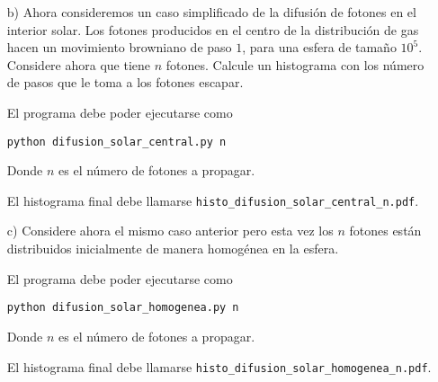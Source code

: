 \documentclass{article}
\begin{document}
\begin{enumerate}
\begin{itemize}
\item[b)] Ahora consideremos un caso simplificado de la difusi\'on de
  fotones en el interior solar. Los fotones producidos
  en el centro de la distribuci\'on de gas hacen un movimiento
  browniano de paso $1$, para una esfera de tama\~no $10^5$. Considere
  ahora que tiene $n$ fotones. Calcule un histograma con los n\'umero
  de pasos que le toma a los fotones escapar.

  El programa debe poder ejecutarse como
\begin{verbatim}
python difusion_solar_central.py n
\end{verbatim}
Donde $n$ es el n\'umero de fotones a propagar. 


El histograma final
debe llamarse \verb"histo_difusion_solar_central_n.pdf".

\item[c)] Considere ahora el mismo caso anterior pero esta vez los $n$
  fotones est\'an distribuidos inicialmente de manera homog\'enea en
  la esfera. 

El programa debe poder ejecutarse como

\begin{verbatim}
python difusion_solar_homogenea.py n
\end{verbatim}

Donde $n$ es el n\'umero de fotones a propagar. 

El histograma final
debe llamarse \verb"histo_difusion_solar_homogenea_n.pdf".

\end{itemize}

\end{enumerate}
\end{document}
